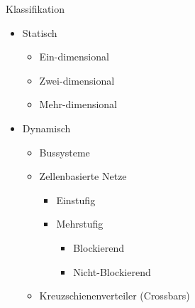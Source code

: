 \begin{defi}[Verbindungsnetzwerk]{Klassifikation}
    \begin{itemize}
        \item Statisch
              \begin{itemize}
                  \item Ein-dimensional
                  \item Zwei-dimensional
                  \item Mehr-dimensional
              \end{itemize}
        \item Dynamisch
              \begin{itemize}
                  \item Bussysteme
                  \item Zellenbasierte Netze
                        \begin{itemize}
                            \item Einstufig
                            \item Mehrstufig
                                  \begin{itemize}
                                      \item Blockierend
                                      \item Nicht-Blockierend
                                  \end{itemize}
                        \end{itemize}
                  \item Kreuzschienenverteiler (Crossbars)
              \end{itemize}
    \end{itemize}
\end{defi}

